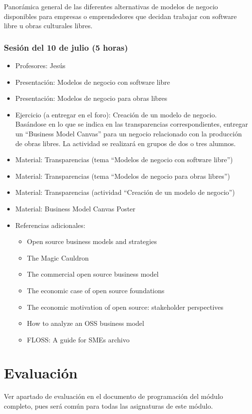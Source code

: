 \documentclass[a4paper,12pt]{article}
\begin{document}
Panorámica general de las diferentes alternativas de modelos de negocio disponibles para empresas o emprendedores que decidan trabajar con software libre u obras culturales libres.

\subsubsection{Sesión del 10 de julio (5 horas)}

\begin{itemize}
\item Profesores: Jesús
\item Presentación: Modelos de negocio con software libre 
\item Presentación: Modelos de negocio para obras libres

 \item Ejercicio (a entregar en el foro): Creación de un modelo de negocio. \\
   Basándose en lo que se indica en las transparencias correspondientes, entregar un ``Business Model Canvas'' para un negocio relacionado con la producción de obras libres. La actividad se realizará en grupos de dos o tres alumnos.
 \item Material: Transparencias (tema ``Modelos de negocio con software libre'')
\item Material: Transparencias (tema ``Modelos de negocio para obras libres'')
\item Material: Transparencias (actividad ``Creación de un modelo de negocio'')
\item Material: Business Model Canvas Poster
\item Referencias adicionales:
  \begin{itemize}
  \item Open source business models and strategies
  \item The Magic Cauldron
  \item The commercial open source business model
  \item The economic case of open source foundations
  \item The economic motivation of open source: stakeholder perspectives
  \item How to analyze an OSS business model
  \item FLOSS: A guide for SMEs archivo  
  \end{itemize}
\end{itemize}


\section{Evaluación}

Ver apartado de evaluación en el documento de programación del módulo completo, pues será común para todas las asignaturas de este módulo.
\end{document}

